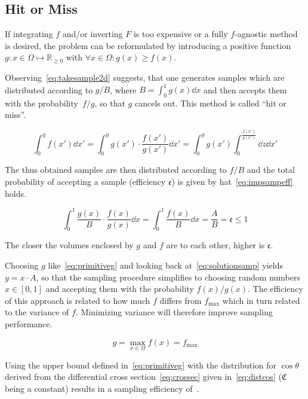 \subsection{Hit or Miss}%
\label{sec:hitmiss}
If integrating \(f\) and/or inverting \(F\) is too expensive or a
fully \(f\)-agnostic method is desired, the problem can be
reformulated by introducing a positive function
\(g\colon x\in\Omega\mapsto\mathbb{R}_{\geq 0}\) with
\(\forall x\in\Omega\colon g(x)\geq f(x)\).

Observing~\eqref{eq:takesample2d} suggests, that one generates samples
which are distributed according to \(g/B\), where
\(B=\int_0^1g(x)\dd{x}\) and then accepts them with the
probability~\(f/g\), so that \(g\) cancels out. This method is called
``hit or miss''.

\begin{equation}
  \label{eq:takesample2d}
  \int_{0}^{y}f(x')\dd{x'} =
  \int_{0}^{y}g(x')\cdot\frac{f(x')}{g(x')}\dd{x'}
  = \int_{0}^{y}g(x')\int_{0}^{\frac{f(x')}{g(x')}}\dd{z}\dd{x'}
\end{equation}

The thus obtained samples are then distributed according to \(f/B\)
and the total probability of accepting a sample (efficiency
\(\mathfrak{e}\)) is given by hat~\eqref{eq:impsampeff} holds.

\begin{equation}
  \label{eq:impsampeff}
  \int_0^1\frac{g(x)}{B}\cdot\frac{f(x)}{g(x)}\dd{x} = \int_0^1\frac{f(x)}{B}\dd{x} = \frac{A}{B} = \mathfrak{e}\leq 1
\end{equation}

The closer the volumes enclosed by \(g\) and \(f\) are to each other,
higher is \(\mathfrak{e}\).

Choosing \(g\) like~\eqref{eq:primitiveg} and looking back
at~\eqref{eq:solutionsamp} yields \(y = x\cdot A\), so that the
sampling procedure simplifies to choosing random numbers
\(x\in [0,1]\) and accepting them with the probability
\(f(x)/g(x)\). The efficiency of this approach is related to how much
\(f\) differs from \(f_{\text{max}}\) which in turn related to the
variance of \(f\). Minimizing variance will therefore improve sampling
performance.

\begin{equation}
  \label{eq:primitiveg}
  g=\max_{x\in\Omega}f(x)=f_{\text{max}}
\end{equation}

Using the upper bound defined in~\eqref{eq:primitiveg} with the
distribution for \(\cos\theta\) derived from the differential cross
section~\eqref{eq:crossec} given in~\eqref{eq:distcos}
(\(\mathfrak{C}\) being a constant) results in a sampling efficiency
of~.

